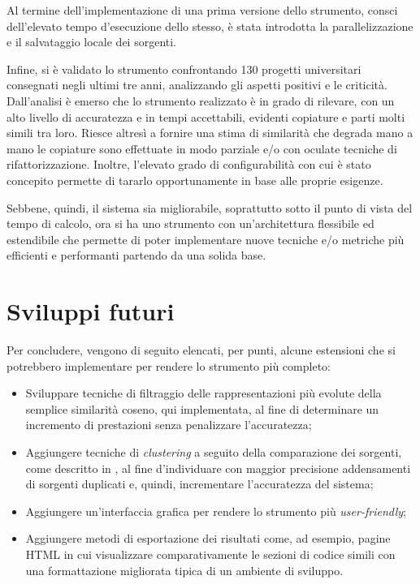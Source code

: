 Al termine dell'implementazione di una prima versione dello strumento, consci dell'elevato tempo d'esecuzione dello stesso, è stata introdotta la parallelizzazione e il salvataggio locale dei sorgenti.

Infine, si è validato lo strumento confrontando 130 progetti universitari consegnati negli ultimi tre anni, analizzando gli aspetti positivi e le criticità. 
%
Dall'analisi è emerso che lo strumento realizzato è in grado di rilevare, con un alto livello di accuratezza e in tempi accettabili, evidenti copiature e parti molti simili tra loro.
%
Riesce altresì a fornire una stima di similarità che degrada mano a mano le copiature sono effettuate in modo parziale e/o con oculate tecniche di rifattorizzazione.
%
Inoltre, l'elevato grado di configurabilità con cui è stato concepito permette di tararlo opportunamente in base alle proprie esigenze.

Sebbene, quindi, il sistema sia migliorabile, soprattutto sotto il punto di vista del tempo di calcolo, ora si ha uno strumento con un'architettura flessibile ed estendibile che permette di poter implementare nuove tecniche e/o metriche più efficienti e performanti partendo da una solida base.

\section{Sviluppi futuri}
Per concludere, vengono di seguito elencati, per punti, alcune estensioni che si potrebbero implementare per rendere lo strumento più completo:
\begin{itemize}
    \item Sviluppare tecniche di filtraggio delle rappresentazioni più evolute della semplice similarità coseno, qui implementata, al fine di determinare un incremento di prestazioni senza penalizzare l'accuratezza;
    \item Aggiungere tecniche di \textit{clustering} a seguito della comparazione dei sorgenti, come descritto in \cite{pdectet}, al fine d'individuare con maggior precisione addensamenti di sorgenti duplicati e, quindi, incrementare l'accuratezza del sistema;
    \item Aggiungere un'interfaccia grafica per rendere lo strumento più \textit{user-friendly};
    \item Aggiungere metodi di esportazione dei risultati come, ad esempio, pagine HTML in cui visualizzare comparativamente le sezioni di codice simili con una formattazione migliorata tipica di un ambiente di sviluppo.
\end{itemize}
